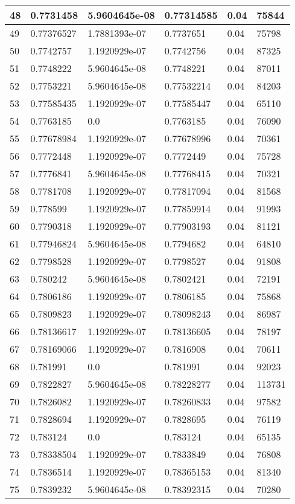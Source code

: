 \begin{longtable}{|l|l|l|l|l|l|}
48 & 0.7731458 & 5.9604645e-08 & 0.77314585 & 0.04 & 75844 \\ \hline 
49 & 0.77376527 & 1.7881393e-07 & 0.7737651 & 0.04 & 75798 \\ \hline 
50 & 0.7742757 & 1.1920929e-07 & 0.7742756 & 0.04 & 87325 \\ \hline 
51 & 0.7748222 & 5.9604645e-08 & 0.7748221 & 0.04 & 87011 \\ \hline 
52 & 0.7753221 & 5.9604645e-08 & 0.77532214 & 0.04 & 84203 \\ \hline 
53 & 0.77585435 & 1.1920929e-07 & 0.77585447 & 0.04 & 65110 \\ \hline 
54 & 0.7763185 & 0.0 & 0.7763185 & 0.04 & 76090 \\ \hline 
55 & 0.77678984 & 1.1920929e-07 & 0.77678996 & 0.04 & 70361 \\ \hline 
56 & 0.7772448 & 1.1920929e-07 & 0.7772449 & 0.04 & 75728 \\ \hline 
57 & 0.7776841 & 5.9604645e-08 & 0.77768415 & 0.04 & 70321 \\ \hline 
58 & 0.7781708 & 1.1920929e-07 & 0.77817094 & 0.04 & 81568 \\ \hline 
59 & 0.778599 & 1.1920929e-07 & 0.77859914 & 0.04 & 91993 \\ \hline 
60 & 0.7790318 & 1.1920929e-07 & 0.77903193 & 0.04 & 81121 \\ \hline 
61 & 0.77946824 & 5.9604645e-08 & 0.7794682 & 0.04 & 64810 \\ \hline 
62 & 0.7798528 & 1.1920929e-07 & 0.7798527 & 0.04 & 91808 \\ \hline 
63 & 0.780242 & 5.9604645e-08 & 0.7802421 & 0.04 & 72191 \\ \hline 
64 & 0.7806186 & 1.1920929e-07 & 0.7806185 & 0.04 & 75868 \\ \hline 
65 & 0.7809823 & 1.1920929e-07 & 0.78098243 & 0.04 & 86987 \\ \hline 
66 & 0.78136617 & 1.1920929e-07 & 0.78136605 & 0.04 & 78197 \\ \hline 
67 & 0.78169066 & 1.1920929e-07 & 0.7816908 & 0.04 & 70611 \\ \hline 
68 & 0.781991 & 0.0 & 0.781991 & 0.04 & 92023 \\ \hline 
69 & 0.7822827 & 5.9604645e-08 & 0.78228277 & 0.04 & 113731 \\ \hline 
70 & 0.7826082 & 1.1920929e-07 & 0.78260833 & 0.04 & 97582 \\ \hline 
71 & 0.7828694 & 1.1920929e-07 & 0.7828695 & 0.04 & 76119 \\ \hline 
72 & 0.783124 & 0.0 & 0.783124 & 0.04 & 65135 \\ \hline 
73 & 0.78338504 & 1.1920929e-07 & 0.7833849 & 0.04 & 76808 \\ \hline 
74 & 0.7836514 & 1.1920929e-07 & 0.78365153 & 0.04 & 81340 \\ \hline 
75 & 0.7839232 & 5.9604645e-08 & 0.78392315 & 0.04 & 70280 \\ \hline 
\end{longtable}